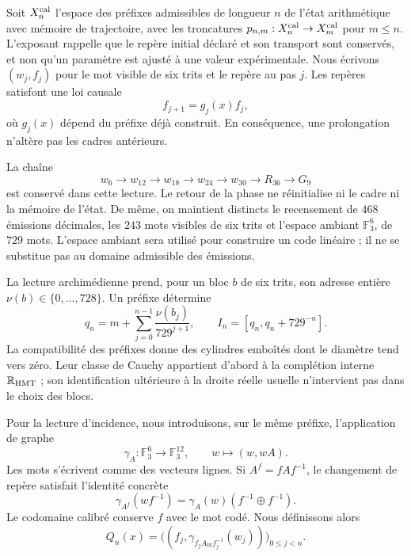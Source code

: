 Soit $X_n^{\rm cal}$ l'espace des préfixes admissibles de longueur $n$ de l'état arithmétique avec mémoire de trajectoire, avec les troncatures $p_{n,m}:X_n^{\rm cal}\to X_m^{\rm cal}$ pour $m\leq n$. L'exposant rappelle que le repère initial déclaré et son transport sont conservés, et non qu'un paramètre est ajusté à une valeur expérimentale. Nous écrivons $(w_j,f_j)$ pour le mot visible de six trits et le repère au pas $j$. Les repères satisfont une loi causale
\[
 f_{j+1}=g_j(x)f_j,
\]
où $g_j(x)$ dépend du préfixe déjà construit. En conséquence, une
prolongation n'altère pas les cadres antérieurs.

La chaîne
\[
 w_6\longrightarrow w_{12}\longrightarrow w_{18}
 \longrightarrow w_{24}\longrightarrow w_{30}
 \longrightarrow R_{36}\longrightarrow G_9
\]
est conservé dans cette lecture. Le retour de la phase ne réinitialise ni le
cadre ni la mémoire de l'état. De même, on maintient distincts le
recensement de $468$ émissions décimales, les $243$ mots visibles de six
trits et l'espace ambiant $\mathbb F_3^6$, de $729$ mots. L'espace ambiant sera
utilisé pour construire un code linéaire ; il ne se substitue pas au domaine
admissible des émissions.

La lecture archimédienne prend, pour un bloc $b$ de six trits, son
adresse entière $\nu(b)\in\{0,\ldots,728\}$. Un préfixe détermine
\[
 q_n=m+\sum_{j=0}^{n-1}\frac{\nu(b_j)}{729^{j+1}},
 \qquad I_n=[q_n,q_n+729^{-n}].
\]
La compatibilité des préfixes donne des cylindres emboîtés dont le diamètre tend
vers zéro. Leur classe de Cauchy appartient d'abord à la complétion interne
$\mathbb R_{\rm HMT}$ ; son identification ultérieure à la droite réelle
usuelle n'intervient pas dans le choix des blocs.

Pour la lecture d'incidence, nous introduisons, sur le même préfixe, l'application de graphe
\begin{equation}
 \gamma_A:\mathbb F_3^6\longrightarrow\mathbb F_3^{12},
 \qquad w\longmapsto(w,wA).
 \label{exc:gamma}
\end{equation}
Les mots s'écrivent comme des vecteurs lignes. Si $A^f=fAf^{-1}$, le changement de repère satisfait l'identité concrète
\begin{equation}
 \gamma_{A^f}(wf^{-1})
   =\gamma_A(w)(f^{-1}\oplus f^{-1}).
 \label{exc:covariancia}
\end{equation}
Le codomaine calibré conserve $f$ avec le mot codé.
Nous définissons alors
\begin{equation}
 Q_n(x)=\bigl((f_j,\gamma_{f_jA_Wf_j^{-1}}(w_j))\bigr)_{0\leq j<n}.
 \label{exc:qn}
\end{equation}

